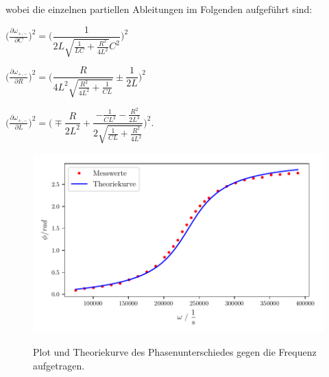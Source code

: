 wobei die einzelnen partiellen Ableitungen im Folgenden aufgeführt sind:

\begin{center}
    $\bigg( \frac{\partial \omega_{+,-}}{\partial C} \bigg)^2 = \Bigg( \dfrac{1}{2L\sqrt{\frac{1}{LC}+\frac{R^2}{4L^2}}C^2} \Bigg)^2$

    $\bigg( \frac{\partial \omega_{+,-}}{\partial R} \bigg)^2 = \Bigg( \dfrac{R}{4L^2\sqrt{\frac{R^2}{4L^2}+\frac{1}{CL}}} \pm \dfrac{1}{2L} \Bigg)^2$

    $\bigg( \frac{\partial \omega_{+,-}}{\partial L} \bigg)^2 = \Bigg( \mp \dfrac{R}{2L^2}+\dfrac{-\frac{1}{CL^2}-\frac{R^2}{2L^3}}{2\sqrt{\frac{1}{CL}+\frac{R^2}{4L^2}}} \Bigg)^2$.
\end{center}

\begin{figure}
    \centering
    \includegraphics{build/plot-phase.pdf}
    \label{fig:phase}
    \caption{Plot und Theoriekurve des Phasenunterschiedes gegen die Frequenz aufgetragen.}
\end{figure}
